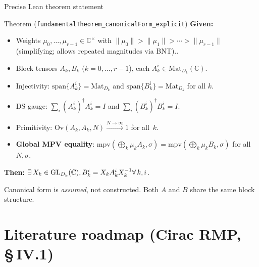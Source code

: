 \documentclass[aspectratio=169,10pt]{beamer}
\newcommand{\Mat}{\mathrm{Mat}}
\newcommand{\Span}{\mathrm{span}}
\newcommand{\Ov}{\mathrm{Ov}}
\begin{document}
\begin{frame}{Precise Lean theorem statement}
    \vspace{-0.6em}

    \begin{block}{Theorem (\texttt{fundamentalTheorem\_canonicalForm\_explicit})}
        \textbf{Given:}
        \begin{itemize}\itemsep0.05em
            \item Weights $\mu_0,\ldots,\mu_{r-1}\in\mathbb{C}^\times$ with
                  \alert{$\|\mu_0\|>\|\mu_1\|>\cdots>\|\mu_{r-1}\|$}
                  \textcolor{dimwhite}{\footnotesize(simplifying; \cite{Cirac2017Annals} allows repeated magnitudes via BNT).}.
            \item Block tensors $A_k, B_k$ ($k=0,\ldots,r{-}1$), each $A_k^i\in\Mat_{D_k}(\mathbb{C})$.
            \item \alert{Injectivity}: $\Span\{A_k^i\}=\Mat_{D_k}$ and $\Span\{B_k^i\}=\Mat_{D_k}$ for all $k$.
            \item \alert{DS gauge}: $\sum_i (A_k^i)^\dagger A_k^i = I$ and $\sum_i (B_k^i)^\dagger B_k^i = I$.
            \item \alert{Primitivity}: $\Ov(A_k,A_k,N)\xrightarrow{N\to\infty} 1$ for all~$k$.
            \item \textbf{Global MPV equality}:
                  $\mathrm{mpv}\!(\bigoplus_k\mu_k A_k, \sigma)
                      =\mathrm{mpv}\!(\bigoplus_k\mu_k B_k, \sigma)$
                  for all~$N,\sigma$.
        \end{itemize}
        \textbf{Then:} $\exists\, X_k\in\mathrm{GL}_{D_k}(\mathbb{C}),  B_k^i = X_k A_k^i X_k^{-1}   \forall\, k,i$.
    \end{block}

    \textcolor{dimwhite}{\footnotesize Canonical form is \emph{assumed}, not constructed.
        Both $A$ and $B$ share the same block structure.}
\end{frame}

\section{\texorpdfstring{Literature roadmap (Cirac RMP, \S\,IV.1)}{Literature roadmap (Cirac RMP, §IV.1)}}
\end{document}
